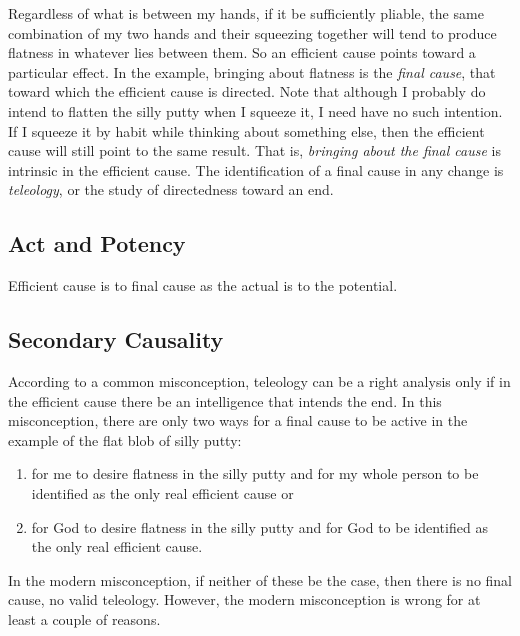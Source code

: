 \documentclass[twocolumn]{article}
\begin{document}
Regardless of what is between my hands, if it be sufficiently pliable, the same
combination of my two hands and their squeezing together will tend to produce
flatness in whatever lies between them.  So an efficient cause points toward a
particular effect.  In the example, bringing about flatness is the \emph{final
cause}, that toward which the efficient cause is directed.  Note that although
I probably do intend to flatten the silly putty when I squeeze it, I need have
no such intention.  If I squeeze it by habit while thinking about something
else, then the efficient cause will still point to the same result.  That is,
\emph{bringing about the final cause} is intrinsic in the efficient cause.  The
identification of a final cause in any change is \emph{teleology}, or the study
of directedness toward an end.

\subsection{Act and Potency}

Efficient cause is to final cause as the actual is to the potential.

\subsection{Secondary Causality}

According to a common misconception, teleology can be a right analysis only if
in the efficient cause there be an intelligence that intends the end.  In this
misconception, there are only two ways for a final cause to be active in the
example of the flat blob of silly putty:
\begin{enumerate}
   \item for me to desire flatness in the silly putty and for my whole person
      to be identified as the only real efficient cause or
   \item for God to desire flatness in the silly putty and for God to be
      identified as the only real efficient cause.
\end{enumerate}
In the modern misconception, if neither of these be the case, then there is no
final cause, no valid teleology.  However, the modern misconception is wrong
for at least a couple of reasons.
\end{document}
